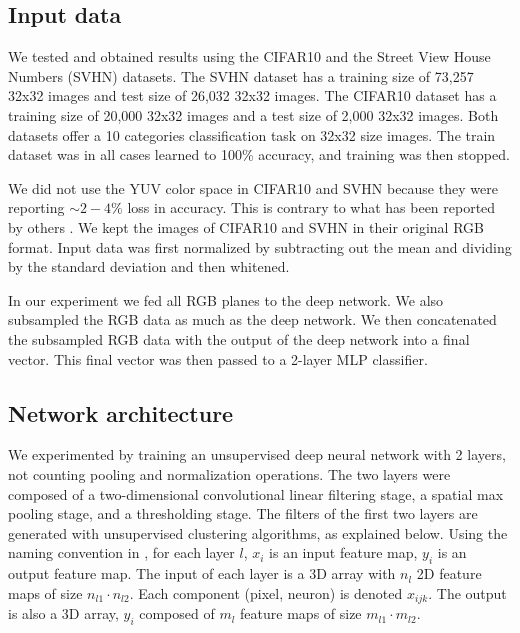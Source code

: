 \documentclass{article} %
\begin{document}
\subsection{Input data}

We tested and obtained results using the CIFAR10 \cite{krizhevsky_learning_2009} and the Street View House Numbers (SVHN) \cite{netzer_reading_2011} datasets. The SVHN dataset has a training size of 73,257 32x32 images and test size of 26,032 32x32 images. The CIFAR10 dataset has a training size of 20,000 32x32 images and a test size of 2,000 32x32 images. Both datasets offer a 10 categories classification task on 32x32 size images. The train dataset was in all cases learned to 100\% accuracy, and training was then stopped. 

We did not use the YUV color space in CIFAR10 and SVHN because they were reporting $\sim 2-4\%$ loss in accuracy. This is contrary to what has been reported by others \cite{jarrett_what_2009}. We kept the images of CIFAR10 and SVHN in their original RGB format. Input data was first normalized by subtracting out the mean and dividing by the standard deviation and then whitened.

In our experiment we fed all RGB planes to the deep network. We also subsampled the RGB data as much as the deep network. We then concatenated the subsampled RGB data with the output of the deep network into a final vector. This final vector was then passed to a 2-layer MLP classifier. 

\subsection{Network architecture}
\label{sec-net-arch}

We experimented by training an unsupervised deep neural network with 2 layers, not counting pooling and normalization operations. The two layers were composed of a two-dimensional convolutional linear filtering stage, a spatial max pooling stage, and a thresholding stage. 
The filters of the first two layers are generated with unsupervised clustering algorithms, as explained below. 
Using the naming convention in \cite{lecun_convolutional_2010}, for each layer $l$,  $x_i$ is an input feature map, $y_i$ is an output feature map. The input of each layer is a 3D array with $n_l$ 2D feature maps of size $n_{l1} \cdot n_{l2}$. Each component (pixel, neuron) is denoted $x_{ijk}$. The output is also a 3D array, $y_i$ composed of $m_l$ feature maps of size $m_{l1} \cdot m_{l2}$.
\end{document}

